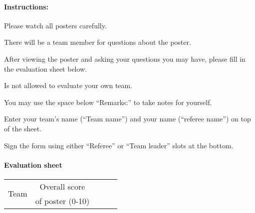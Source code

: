 \paragraph{Instructions:}
\begin{compactenum}
\item Please watch all posters carefully.
\item There will be a team member for questions about the poster.
\item After viewing the poster and asking your questions you may have, please fill in the evaluation sheet below.
\item Is not allowed to evaluate your own team.
\item You may use the space below ``Remarks:'' to take notes for yourself.
\item Enter your team's name (``Team name'') and your name (``referee name'') on top of the sheet.
\item Sign the form using either ``Referee'' or ``Team leader'' slots at the bottom.
\end{compactenum}

\paragraph{Evaluation sheet}
\begin{center}
\begingroup
\newcommand\tableTEAMS{}
\def\do#1{\appto\tableTEAMS{#1 & & & & \\\hline}}%
\expandafter\docsvlist\expandafter{\TEAMSSTAGEONE}
\begin{tabular}{|l|c|c|c|c|}
  \hline
  \multirow{2}{*}{Team} & Overall score     \\
                        & of poster (0-10)  \\
  \hline
  \hline
  \tableTEAMS
\end{tabular}
\endgroup
\end{center}

